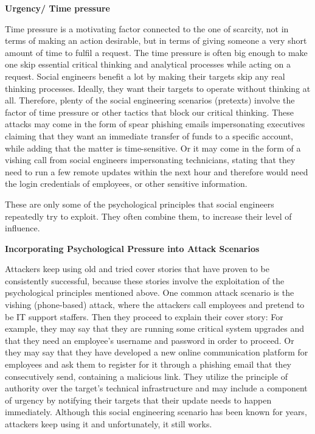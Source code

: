 \textbf{Urgency/ Time pressure}

Time pressure is a motivating factor connected to the one of scarcity, not in terms of making an action desirable, but in terms of giving someone a very short amount of time to fulfil a request. The time pressure is often big enough to make one skip essential critical thinking and analytical processes while acting on a request. Social engineers benefit a lot by making their targets skip any real thinking processes. Ideally, they want their targets to operate without thinking at all. Therefore, plenty of the social engineering scenarios (pretexts) involve the factor of time pressure or other tactics that block our critical thinking. These attacks may come in the form of spear phishing emails impersonating executives claiming that they want an immediate transfer of funds to a specific account, while adding that the matter is time-sensitive. Or it may come in the form of a vishing call from social engineers impersonating technicians, stating that they need to run a few remote updates within the next hour and therefore would need the login credentials of employees, or other sensitive information.

These are only some of the psychological principles that social engineers repeatedly try to exploit. They often combine them, to increase their level of influence.

\textbf{Incorporating Psychological Pressure into Attack Scenarios}

Attackers keep using old and tried cover stories that have proven to be consistently successful, because these stories involve the exploitation of the psychological principles mentioned above. One common attack scenario is the vishing (phone-based) attack, where the attackers call employees and pretend to be IT support staffers. Then they proceed to explain their cover story: For example, they may say that they are running some critical system upgrades and that they need an employee’s username and password in order to proceed. Or they may say that they have developed a new online communication platform for employees and ask them to register for it through a phishing email that they consecutively send, containing a malicious link. They utilize the principle of authority over the target’s technical infrastructure and may include a component of urgency by notifying their targets that their update needs to happen immediately. Although this social engineering scenario has been known for years, attackers keep using it and unfortunately, it still works.

